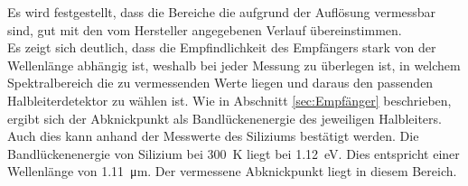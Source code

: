 \documentclass[a4paper,twoside,final]{article}
\begin{document}
%

\FloatBarrier

Es wird festgestellt, dass die Bereiche die aufgrund der Auflösung vermessbar sind, gut mit den vom Hersteller angegebenen Verlauf übereinstimmen. \\
Es zeigt sich deutlich, dass die Empfindlichkeit des Empfängers stark von der Wellenlänge abhängig ist, weshalb bei jeder Messung zu überlegen ist, in welchem Spektralbereich die zu vermessenden Werte liegen und daraus den passenden Halbleiterdetektor zu wählen ist. Wie in Abschnitt \ref{sec:Empfänger} beschrieben, ergibt sich der Abknickpunkt als Bandlückenenergie des jeweiligen Halbleiters. Auch dies kann anhand der Messwerte des Siliziums bestätigt werden. Die Bandlückenenergie von Silizium bei \SI{300}{\kelvin} liegt bei \SI{1.12}{\electronvolt}. Dies entspricht einer Wellenlänge von \SI{1.11}{\micro\meter}. Der vermessene Abknickpunkt liegt in diesem Bereich.
\end{document}
